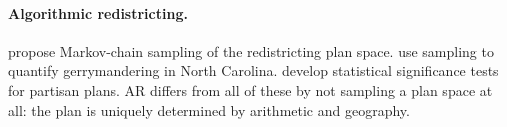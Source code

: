 \paragraph{Algorithmic redistricting.}
\citet{duchin2019gerrychain} propose Markov-chain sampling of the redistricting
plan space. \citet{herschlag2020quantifying} use sampling to quantify
gerrymandering in North Carolina. \citet{chikina2017assessing} develop
statistical significance tests for partisan plans. AR differs from all of
these by not sampling a plan space at all: the plan is uniquely determined by
arithmetic and geography.

